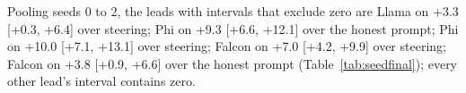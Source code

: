 Pooling seeds 0 to 2, the leads with intervals that exclude zero are Llama on \LB{} +3.3 [+0.3, +6.4] over steering; Phi on \LB{} +9.3 [+6.6, +12.1] over the honest prompt; Phi on \AIL{} +10.0 [+7.1, +13.1] over steering; Falcon on \LB{} +7.0 [+4.2, +9.9] over steering; Falcon on \AIL{} +3.8 [+0.9, +6.6] over the honest prompt (Table~\ref{tab:seedfinal}); every other lead's interval contains zero.
